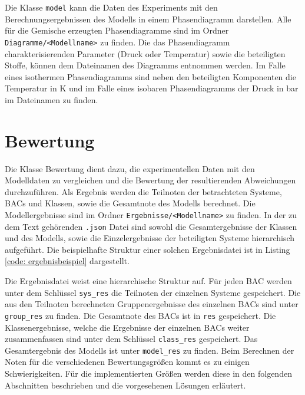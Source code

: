 \documentclass[../thesis.tex]{subfiles}
\begin{document}
Die Klasse \texttt{model} kann die Daten des Experiments mit den Berechnungsergebnissen des Modells in einem Phasendiagramm darstellen. Alle für die Gemische erzeugten Phasendiagramme sind im Ordner \texttt{Diagramme/<Modellname>} zu finden. Die das Phasendiagramm charakterisierenden Parameter (Druck oder Temperatur) sowie die beteiligten Stoffe, können dem Dateinamen des Diagramms entnommen werden. Im Falle eines isothermen Phasendiagramms sind neben den beteiligten Komponenten die Temperatur in K und im Falle eines isobaren Phasendiagramms der Druck in bar im Dateinamen zu finden.

\section{Bewertung}

Die Klasse Bewertung dient dazu, die experimentellen Daten mit den Modelldaten zu vergleichen und die Bewertung der resultierenden Abweichungen durchzuführen. Als Ergebnis werden die Teilnoten der betrachteten Systeme, BACs und Klassen, sowie die Gesamtnote des Modells berechnet. Die Modellergebnisse sind im Ordner \texttt{Ergebnisse/<Modellname>} zu finden. In der zu dem Text gehörenden \texttt{.json} Datei sind sowohl die Gesamtergebnisse der Klassen und des Modells, sowie die Einzelergebnisse der beteiligten Systeme hierarchisch aufgeführt. Die beispielhafte Struktur einer solchen Ergebnisdatei ist in Listing \autoref{code: ergebnisbeispiel} dargestellt.


\label{code: ergebnisbeispiel}

Die Ergebnisdatei weist eine hierarchische Struktur auf. Für jeden BAC werden unter dem Schlüssel \texttt{sys\_res} die Teilnoten der einzelnen Systeme gespeichert. Die aus den Teilnoten berechneten Gruppenergebnisse des einzelnen BACs sind unter \texttt{group\_res} zu finden. Die Gesamtnote des BACs ist in \texttt{res} gespeichert. Die Klassenergebnisse, welche die Ergebnisse der einzelnen BACs weiter zusammenfassen sind unter dem Schlüssel \texttt{class\_res} gespeichert. Das Gesamtergebnis des Modells ist unter \texttt{model\_res} zu finden. Beim Berechnen der Noten für die verschiedenen Bewertungsgrößen kommt es zu einigen Schwierigkeiten. Für die implementierten Größen werden diese in den folgenden Abschnitten beschrieben und die vorgesehenen Lösungen erläutert.
\end{document}
